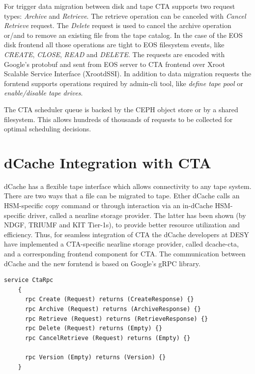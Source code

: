 \documentclass{webofc}
\begin{document}
For trigger data migration between disk and tape CTA supports two request types: \textit{Archive} and \textit{Retrieve}. The retrieve operation can be canceled with \textit{Cancel Retrieve} request. The \textit{Delete} request is used to cancel the archive operation or/and to remove an existing file from the tape catalog. In the case of the EOS disk frontend all those operations are tight to EOS filesystem events, like \textit{CREATE}, \textit{CLOSE}, \textit{READ} and \textit{DELETE}. The requests are encoded with Google's protobuf \cite{prtobuf} and sent from EOS server to CTA frontend over Xroot Scalable Service Interface (XrootdSSI). In addition to data migration requests the forntend supports operations required by admin-cli tool, like \textit{define tape pool} or \textit{enable/disable tape drives}.

The CTA scheduler queue is backed by the CEPH object store or by a shared filesystem. This allows hundreds of thousands of requests to be collected for optimal scheduling decisions.

\section{dCache Integration with CTA}
\label{sec:integration}

dCache has a flexible tape interface which allows connectivity to any tape system. There are two ways that a file can be migrated to tape. Ether dCache calls an HSM-specific copy command or through interaction via an in-dCache HSM-specific driver, called a nearline storage provider. The latter has been shown (by NDGF, TRIUMF and KIT Tier-1s), to provide better resource utilization and efficiency\cite{endit_kit}. Thus, for seamless integration of CTA the dCache developers at DESY have implemented a CTA-specific nearline storage provider, called dcache-cta\cite{dcache_cta}, and a corresponding frontend component for CTA. The communication between dCache and the new forntend is based on Google’s gRPC library.

\begin{lstlisting}[label=grpc-frontend,caption={gRPC service definition},keywords={service,rpc,returns}]
    service CtaRpc
    {
      rpc Create (Request) returns (CreateResponse) {}
      rpc Archive (Request) returns (ArchiveResponse) {}
      rpc Retrieve (Request) returns (RetrieveResponse) {}
      rpc Delete (Request) returns (Empty) {}
      rpc CancelRetrieve (Request) returns (Empty) {}
    
      rpc Version (Empty) returns (Version) {}
    }
\end{lstlisting}
\end{document}

